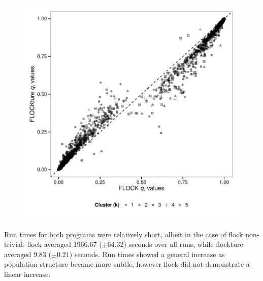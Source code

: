 \begin{figure}
\begin{minipage}{.45\textwidth}
  \includegraphics[width=.9\linewidth]{images/Figures-Pat/FlockvFlockture_qi.pdf}
  \label{fig:FvFqi}
\end{minipage}
\end{figure}

Run times for both programs were relatively short, albeit in the case of {\sc flock} 
non-trivial. {\sc flock} averaged 1966.67 ($\pm 64.32$) seconds
over all runs, while {\sc flockture} averaged 9.83 ($\pm 0.21$) seconds. Run times showed a 
general increase as population structure became more subtle, however {\sc flock} did not 
demonstrate a linear increase. 

